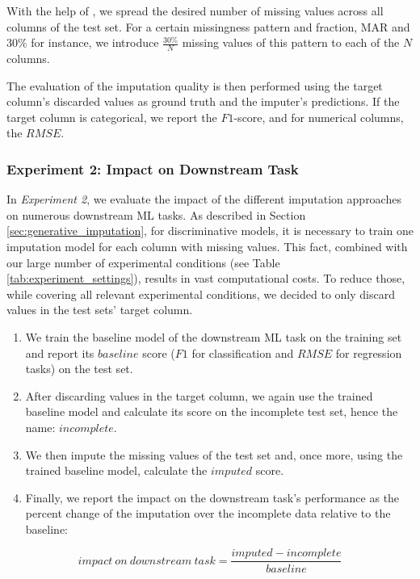 With the help of , we spread the desired number of missing values across all columns of the test set. For a certain missingness pattern and fraction, MAR and $30\%$ for instance, we introduce $\frac{30\%}{N}$ missing values of this pattern to each of the $N$ columns.

The evaluation of the imputation quality is then performed using the target column's discarded values as ground truth and the imputer's predictions. If the target column is categorical, we report the $F1$-score, and for numerical columns, the $RMSE$.


\subsubsection{Experiment 2: Impact on Downstream Task}
\label{sec:experiment_2}
%
In \emph{Experiment 2}, we evaluate the impact of the different imputation approaches on numerous downstream ML tasks. As described in Section \ref{sec:generative_imputation}, for discriminative models, it is necessary to train one imputation model for each column with missing values. This fact, combined with our large number of experimental conditions (see Table \ref{tab:experiment_settings}), results in vast computational costs. To reduce those, while covering all relevant experimental conditions, we decided to only discard values in the test sets’ target column.

\begin{enumerate}
\item We train the baseline model of the downstream ML task on the training set and report its $baseline$ score ($F1$ for classification and $RMSE$ for regression tasks) on the test set.
\item After discarding values in the target column, we again use the trained baseline model and calculate its score on the incomplete test set, hence the name: $incomplete$.
\item We then impute the missing values of the test set and, once more, using the trained baseline model, calculate the $imputed$ score.
\item Finally, we report the impact on the downstream task's performance as the percent change of the imputation over the incomplete data relative to the baseline:
\end{enumerate}
%
\begin{equation}
	impact\ on \ downstream\ task = \frac{imputed - incomplete}{baseline}
	\label{eq:impact}
\end{equation}
%



